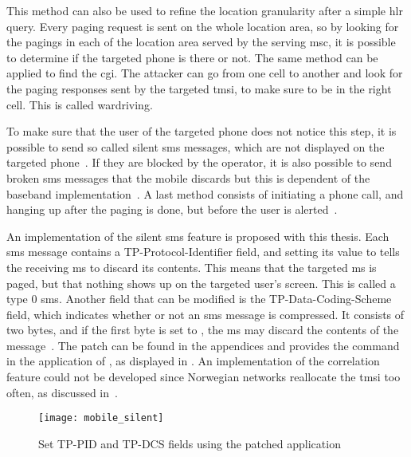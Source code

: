       This method can also be used to refine the location granularity
      after a simple \gls{hlr} query. Every paging request is sent on
      the whole location area, so by looking for the pagings in each of
      the location area served by the serving \gls{msc}, it is possible
      to determine if the targeted phone is there or not. The same
      method can be applied to find the \gls{cgi}. The attacker can go
      from one cell to another and look for the paging responses sent by
      the targeted \gls{tmsi}, to make sure to be in the right cell.
      This is called wardriving.

      To make sure that the user of the targeted phone does not notice
      this step, it is possible to send so called silent \gls{sms}
      messages, which are not displayed on the targeted
      phone~\cite[p.~53]{3gpp_ts_2001}. If they are blocked by the
      operator, it is also possible to send broken \gls{sms} messages
      that the mobile discards but this is dependent of the baseband
      implementation~\cite{golde_sms-o-death:_2011}. A last method
      consists of initiating a phone call, and hanging up after the
      paging is done, but before the user is
      alerted~\cite{kune_location_2012}.

      An implementation of the silent \gls{sms} feature is proposed with
      this thesis. Each \gls{sms} message contains a
      TP-Protocol-Identifier field, and setting its value to 
      tells the receiving \gls{ms} to discard its contents. This means
      that the targeted \gls{ms} is paged, but that nothing shows up on
      the targeted user's screen. This is called a type 0 \gls{sms}.
      Another field that can be modified is the TP-Data-Coding-Scheme
      field, which indicates whether or not an \gls{sms} message is
      compressed. It consists of two bytes, and if the first byte is set
      to , the \gls{ms} may discard the contents of the
      message~\cite[p.~6]{etsi_gsm_1999}. The patch can be found in the
      appendices  and provides the 
      command in the  application of , as
      displayed in . An implementation of the
      correlation feature could not be developed since Norwegian
      networks reallocate the \gls{tmsi} too often, as discussed
      in~.

      \begin{figure}[h]
        \centering
        \texttt{[image: mobile\_silent]}
        \caption{Set TP-PID and TP-DCS fields using the patched
         application}
        \label{fig:mobile_silent}
      \end{figure}
      
